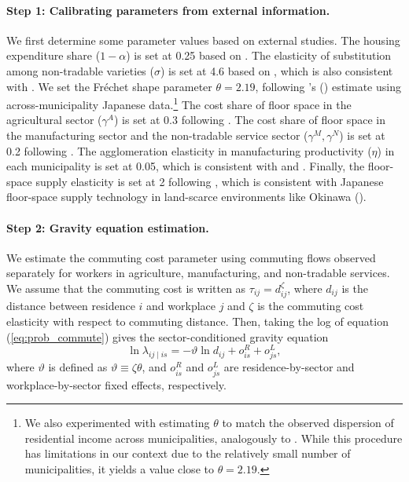 \documentclass[12pt, unicode, a4paper]{article}
\newcommand{\1}{\mbox{1}\hspace{-0.25em}\mbox{l}} %
\begin{document}
\paragraph{Step 1: Calibrating parameters from external information.}

We first determine some parameter values based on external studies. The housing expenditure share ($1-\alpha$) is set at 0.25 based on \citet{davis2011household}.
The elasticity of substitution among non-tradable varieties ($\sigma$) is set at 4.6 based on \citet{miyauchi2022economics}, which is also consistent with \citet{hobijn2019sticker}. 
We set the Fr\'{e}chet shape parameter $\theta=2.19$, following \citeauthor{hayakawa2021highspeed}'s (\citeyear{hayakawa2021highspeed}) estimate using across-municipality Japanese data.\footnote{
We also experimented with estimating $\theta$ to match the observed dispersion of residential income across municipalities, analogously to \cite{ahlfeldt2015economics}. 
While this procedure has limitations in our context due to the relatively small number of municipalities, it yields a value close to $\theta=2.19$.
}
The cost share of floor space in the agricultural sector ($\gamma^A$) is set at 0.3 following \cite{hayashi2008japan}. The cost share of floor space in the manufacturing sector and the non-tradable service sector ($\gamma^M, \gamma^N$) is set at 0.2 following \citet{ahlfeldt2015economics}. 
The agglomeration elasticity in manufacturing productivity ($\eta$) in each municipality is set at 0.05, which is consistent with \cite{rosenthal2004agglomeration} and \cite{ahlfeldt2019economic}. Finally, the floor-space supply elasticity is set at 2 following \cite{heblich2020making}, which is consistent with Japanese floor-space supply technology in land-scarce environments like Okinawa (\citealt{yoshida18}). 


\paragraph{Step 2: Gravity equation estimation.}

We estimate the commuting cost parameter using commuting flows observed separately for workers in agriculture, manufacturing, and non-tradable services. We assume that the commuting cost is written as $\tau_{ij} = d_{ij}^\zeta $, where $d_{ij}$ is the distance between residence $i$ and workplace $j$ and $\zeta$ is the commuting cost elasticity with respect to commuting distance. Then, taking the log of equation (\ref{eq:prob_commute}) gives the sector-conditioned gravity equation
\begin{equation}
\label{eq:commuting_gravity_sector}
    \ln\lambda_{ij\mid is}
    =
    -\vartheta\ln d_{ij}
    +o_{is}^{R}+o_{js}^{L} ,
\end{equation}
where $\vartheta$ is defined as $\vartheta \equiv \zeta\theta$, and $o_{is}^{R}$ and $o_{js}^{L}$ are residence-by-sector and workplace-by-sector fixed effects, respectively.
\end{document}
